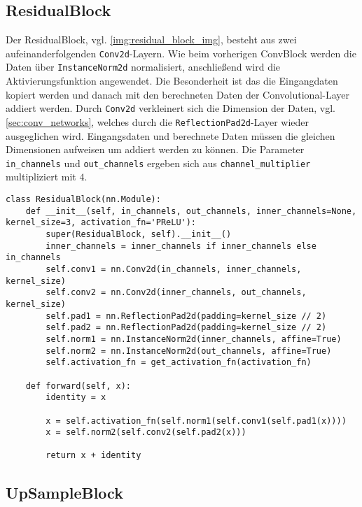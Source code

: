 \subsection{ResidualBlock}

Der ResidualBlock, vgl. \ref{img:residual_block_img}, besteht aus zwei aufeinanderfolgenden \texttt{Conv2d}-Layern. Wie beim vorherigen ConvBlock werden die Daten über \texttt{InstanceNorm2d} normalisiert, anschließend wird die Aktivierungsfunktion angewendet. Die Besonderheit ist das die Eingangdaten kopiert werden und danach mit den berechneten Daten der Convolutional-Layer addiert werden. Durch \texttt{Conv2d} verkleinert sich die Dimension der Daten, vgl. \ref{sec:conv_networks}, welches durch die \texttt{ReflectionPad2d}-Layer wieder ausgeglichen wird. Eingangsdaten und berechnete Daten müssen die gleichen Dimensionen aufweisen um addiert werden zu können. Die Parameter \texttt{in_channels} und \texttt{out_channels} ergeben sich aus \texttt{channel_multiplier} multipliziert mit $ 4 $.


\begin{listing}[H]
\begin{verbatim}
class ResidualBlock(nn.Module):
    def __init__(self, in_channels, out_channels, inner_channels=None, kernel_size=3, activation_fn='PReLU'):
        super(ResidualBlock, self).__init__()
        inner_channels = inner_channels if inner_channels else in_channels
        self.conv1 = nn.Conv2d(in_channels, inner_channels, kernel_size)
        self.conv2 = nn.Conv2d(inner_channels, out_channels, kernel_size)
        self.pad1 = nn.ReflectionPad2d(padding=kernel_size // 2)
        self.pad2 = nn.ReflectionPad2d(padding=kernel_size // 2)
        self.norm1 = nn.InstanceNorm2d(inner_channels, affine=True)
        self.norm2 = nn.InstanceNorm2d(out_channels, affine=True)
        self.activation_fn = get_activation_fn(activation_fn)

    def forward(self, x):
        identity = x

        x = self.activation_fn(self.norm1(self.conv1(self.pad1(x))))
        x = self.norm2(self.conv2(self.pad2(x)))

        return x + identity
\end{verbatim}
\end{listing}

\subsection{UpSampleBlock}

